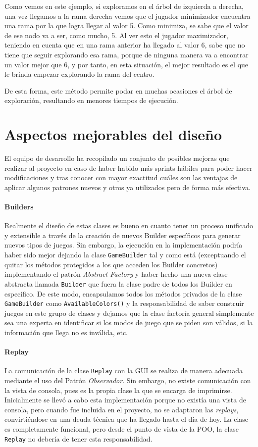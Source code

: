 \documentclass[../DocumentoOficial.tex]{subfiles}
\begin{document}
Como vemos en este ejemplo, si exploramos en el árbol de izquierda a derecha, una vez llegamos a la rama derecha vemos que el jugador minimizador encuentra una rama por la que logra llegar al valor 5. Como minimiza, se sabe que el valor de ese nodo va a ser, como mucho, 5. Al ver esto el jugador maximizador, teniendo en cuenta que en una rama anterior ha llegado al valor 6, sabe que no tiene que seguir explorando esa rama, porque de ninguna manera va a encontrar un valor mejor que 6, y por tanto, en esta situación, el mejor resultado es el que le brinda empezar explorando la rama del centro.

De esta forma, este método permite podar en muchas ocasiones el árbol de exploración, resultando en menores tiempos de ejecución.

\chapter{Aspectos mejorables del diseño}
El equipo de desarrollo ha recopilado un conjunto de posibles mejoras que realizar al proyecto en caso de haber habido más sprints hábiles para poder hacer modificaciones y tras conocer con mayor exactitud cuáles son las ventajas de aplicar algunos patrones nuevos y otros ya utilizados pero de forma más efectiva.

\subsubsection{Builders}
Realmente el diseño de estas clases es bueno en cuanto tener un proceso unificado y extensible a través de la creación de nuevos Builder específicos para generar nuevos tipos de juegos. Sin embargo, la ejecución en la implementación podría haber sido mejor dejando la clase \texttt{GameBuilder} tal y como está (exceptuando el quitar los métodos protegidos a los que acceden los Builder concretos) implementando el patrón \textit{Abstract Factory} y haber hecho una nueva clase abstracta llamada \texttt{Builder} que fuera la clase padre de todos los Builder en específico. De este modo, encapsulamos todos los métodos privados de la clase \texttt{GameBuilder} como \texttt{AvailableColors()} y la responsabilidad de saber construir juegos en este grupo de clases y dejamos que la clase factoría general simplemente sea una experta en identificar si los modos de juego que se piden son válidos, si la información que llega no es inválida, etc.

\subsubsection{Replay}
La comunicación de la clase \texttt{Replay} con la GUI se realiza de manera adecuada mediante el uso del Patrón \textit{Observador}. Sin embargo, no existe comunicación con la vista de consola, pues es la propia clase la que se encarga de imprimirse. Inicialmente se llevó a cabo esta implementación porque no existía una vista de consola, pero cuando fue incluida en el proyecto, no se adaptaron las \textit{replays}, convirtiéndose en una deuda técnica que ha llegado hasta el día de hoy. La clase es completamente funcional, pero desde el punto de vista de la POO, la clase \texttt{Replay} no debería de tener esta responsabilidad.
\end{document}
